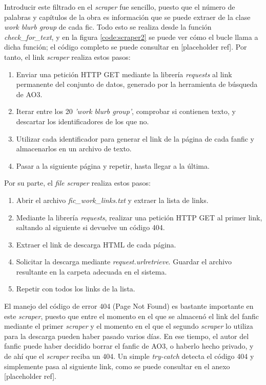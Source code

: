 \documentclass{pre-tfg}
\newcommand{\refToLinkScraperCode}{[placeholder ref]}
\newcommand{\refToFileScraperCode}{[placeholder ref]}
\begin{document}
Introducir este filtrado en el \textit{scraper} fue sencillo, puesto que el número de palabras y capítulos de la obra es información que se puede extraer de la clase \textit{work blurb group} de cada fic. Todo esto se realiza desde la función \textit{check\_for\_text}, y en la figura \ref{code:scraper2} se puede ver cómo el bucle llama a dicha función; el código completo se puede consultar en \refToLinkScraperCode. Por tanto, el link \textit{scraper} realiza estos pasos:
\begin{enumerate}
	\item Enviar una petición HTTP GET mediante la librería \textit{requests} al link permanente del conjunto de datos, generado por la herramienta de búsqueda de AO3.
	\item Iterar entre los 20 \textit{'work blurb group'}, comprobar si contienen texto, y descartar los identificadores de los que no.
	\item Utilizar cada identificador para generar el link de la página de cada fanfic y almacenarlos en un archivo de texto.
	\item Pasar a la siguiente página y repetir, hasta llegar a la última.
\end{enumerate}

Por su parte, el \textit{file scraper} realiza estos pasos:
\begin{enumerate}
	\item Abrir el archivo \textit{fic\_work\_links.txt} y extraer la lista de links.
	\item Mediante la librería \textit{requests}, realizar una petición HTTP GET al primer link, saltando al siguiente si devuelve un código 404.
	\item Extraer el link de descarga HTML de cada página.
	\item Solicitar la descarga mediante \textit{request.urlretrieve}. Guardar el archivo resultante en la carpeta adecuada en el sistema.
	\item Repetir con todos los links de la lista.
\end{enumerate}

El manejo del código de error 404 (Page Not Found) es bastante importante en este \textit{scraper}, puesto que entre el momento en el que se almacenó el link del fanfic mediante el primer \textit{scraper} y el momento en el que el segundo \textit{scraper} lo utiliza para la descarga pueden haber pasado varios días. En ese tiempo, el autor del fanfic puede haber decidido borrar el fanfic de AO3, o haberlo hecho privado, y de ahí que el \textit{scraper} reciba un 404. Un simple \textit{try-catch} detecta el código 404 y simplemente pasa al siguiente link, como se puede consultar en el anexo \refToFileScraperCode.
\end{document}
